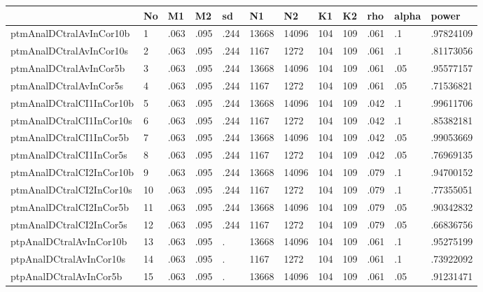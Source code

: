 \begin{tabular}{|l|l|l|l|l|l|l|l|l|l|l|l|}\hline  
 & No  & M1  & M2  & sd  & N1  & N2  & K1  & K2  & rho  & alpha  & power  \\ \hline  
ptmAnalDCtralAvInCor10b & 1 & .063 & .095 & .244 & 13668 & 14096 & 104 & 109 & .061 & .1 & .97824109 \\ \hline 
ptmAnalDCtralAvInCor10s & 2 & .063 & .095 & .244 & 1167 & 1272 & 104 & 109 & .061 & .1 & .81173056 \\ \hline 
ptmAnalDCtralAvInCor5b & 3 & .063 & .095 & .244 & 13668 & 14096 & 104 & 109 & .061 & .05 & .95577157 \\ \hline 
ptmAnalDCtralAvInCor5s & 4 & .063 & .095 & .244 & 1167 & 1272 & 104 & 109 & .061 & .05 & .71536821 \\ \hline 
ptmAnalDCtralCI1InCor10b & 5 & .063 & .095 & .244 & 13668 & 14096 & 104 & 109 & .042 & .1 & .99611706 \\ \hline 
ptmAnalDCtralCI1InCor10s & 6 & .063 & .095 & .244 & 1167 & 1272 & 104 & 109 & .042 & .1 & .85382181 \\ \hline 
ptmAnalDCtralCI1InCor5b & 7 & .063 & .095 & .244 & 13668 & 14096 & 104 & 109 & .042 & .05 & .99053669 \\ \hline 
ptmAnalDCtralCI1InCor5s & 8 & .063 & .095 & .244 & 1167 & 1272 & 104 & 109 & .042 & .05 & .76969135 \\ \hline 
ptmAnalDCtralCI2InCor10b & 9 & .063 & .095 & .244 & 13668 & 14096 & 104 & 109 & .079 & .1 & .94700152 \\ \hline 
ptmAnalDCtralCI2InCor10s & 10 & .063 & .095 & .244 & 1167 & 1272 & 104 & 109 & .079 & .1 & .77355051 \\ \hline 
ptmAnalDCtralCI2InCor5b & 11 & .063 & .095 & .244 & 13668 & 14096 & 104 & 109 & .079 & .05 & .90342832 \\ \hline 
ptmAnalDCtralCI2InCor5s & 12 & .063 & .095 & .244 & 1167 & 1272 & 104 & 109 & .079 & .05 & .66836756 \\ \hline 
ptpAnalDCtralAvInCor10b & 13 & .063 & .095 & . & 13668 & 14096 & 104 & 109 & .061 & .1 & .95275199 \\ \hline 
ptpAnalDCtralAvInCor10s & 14 & .063 & .095 & . & 1167 & 1272 & 104 & 109 & .061 & .1 & .73922092 \\ \hline 
ptpAnalDCtralAvInCor5b & 15 & .063 & .095 & . & 13668 & 14096 & 104 & 109 & .061 & .05 & .91231471 \\ \hline 

\end{tabular}
